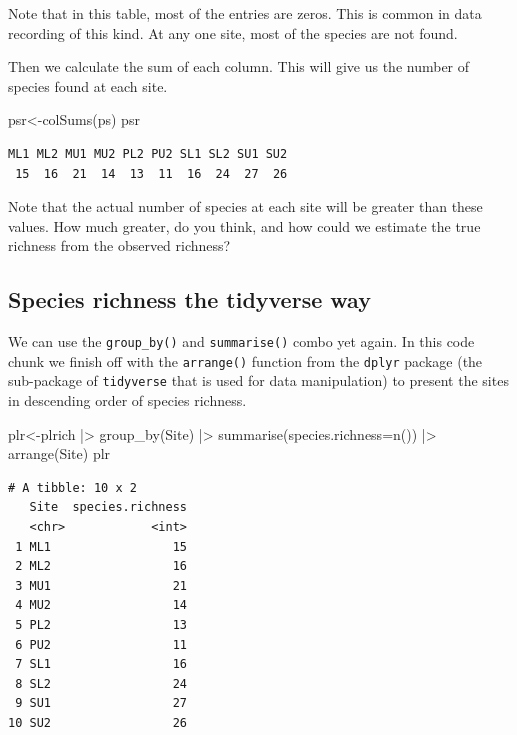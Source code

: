 \documentclass[
  letterpaper,
  DIV=11,
  numbers=noendperiod]{scrreprt}
\newenvironment{Shaded}{\begin{snugshade}}{\end{snugshade}}
\newcommand{\AttributeTok}[1]{\textcolor[rgb]{0.40,0.45,0.13}{#1}}
\newcommand{\FunctionTok}[1]{\textcolor[rgb]{0.28,0.35,0.67}{#1}}
\newcommand{\NormalTok}[1]{\textcolor[rgb]{0.00,0.23,0.31}{#1}}
\newcommand{\OtherTok}[1]{\textcolor[rgb]{0.00,0.23,0.31}{#1}}
\newcommand{\SpecialCharTok}[1]{\textcolor[rgb]{0.37,0.37,0.37}{#1}}
\begin{document}
Note that in this table, most of the entries are zeros. This is common
in data recording of this kind. At any one site, most of the species are
not found.

Then we calculate the sum of each column. This will give us the number
of species found at each site.

\begin{Shaded}
\begin{Highlighting}[]
\NormalTok{psr}\OtherTok{\textless{}{-}}\FunctionTok{colSums}\NormalTok{(ps)}
\NormalTok{psr}
\end{Highlighting}
\end{Shaded}

\begin{verbatim}
ML1 ML2 MU1 MU2 PL2 PU2 SL1 SL2 SU1 SU2 
 15  16  21  14  13  11  16  24  27  26 
\end{verbatim}

Note that the actual number of species at each site will be greater than
these values. How much greater, do you think, and how could we estimate
the true richness from the observed richness?

\subsection{Species richness the tidyverse
way}\label{species-richness-the-tidyverse-way}

We can use the \texttt{group\_by()} and \texttt{summarise()} combo yet
again. In this code chunk we finish off with the \texttt{arrange()}
function from the \texttt{dplyr} package (the sub-package of
\texttt{tidyverse} that is used for data manipulation) to present the
sites in descending order of species richness.

\begin{Shaded}
\begin{Highlighting}[]
\NormalTok{plr}\OtherTok{\textless{}{-}}\NormalTok{plrich }\SpecialCharTok{|\textgreater{}}
  \FunctionTok{group\_by}\NormalTok{(Site) }\SpecialCharTok{|\textgreater{}}
  \FunctionTok{summarise}\NormalTok{(}\AttributeTok{species.richness=}\FunctionTok{n}\NormalTok{()) }\SpecialCharTok{|\textgreater{}}
  \FunctionTok{arrange}\NormalTok{(Site)}
\NormalTok{plr}
\end{Highlighting}
\end{Shaded}

\begin{verbatim}
# A tibble: 10 x 2
   Site  species.richness
   <chr>            <int>
 1 ML1                 15
 2 ML2                 16
 3 MU1                 21
 4 MU2                 14
 5 PL2                 13
 6 PU2                 11
 7 SL1                 16
 8 SL2                 24
 9 SU1                 27
10 SU2                 26
\end{verbatim}
\end{document}
